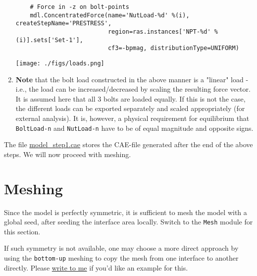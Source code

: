 \documentclass[11pt]{article}
\begin{document}
\begin{enumerate}
\begin{verbatim}
    # Force in -z on bolt-points
    mdl.ConcentratedForce(name='NutLoad-%d' %(i), createStepName='PRESTRESS',
                          region=ras.instances['NPT-%d' %(i)].sets['Set-1'],
                          cf3=-bpmag, distributionType=UNIFORM)
\end{verbatim}
\begin{center}
\texttt{[image: ./figs/loads.png]}
\end{center}
\item \textbf{Note} that the bolt load constructed in the above manner is a "linear" load - i.e., the load can be increased/decreased by scaling the resulting force vector.
It is assumed here that all 3 bolts are loaded equally.
If this is not the case, the different loads can be exported separately and scaled appropriately (for external analysis).
It is, however, a physical requirement for equilibrium that \texttt{BoltLoad-n} and \texttt{NutLoad-n} have to be of equal magnitude and opposite signs.
\end{enumerate}

The file \href{https://github.com/Nidish96/Abaqus4Joints/blob/main/assets/assembly/model\_step1.cae}{model\_step1.cae} stores the CAE-file generated after the end of the above steps.
We will now proceed with meshing.
\pagebreak
\section{Meshing}
\label{sec:meshing}
Since the model is perfectly symmetric, it is sufficient to mesh the model with a global seed, after seeding the interface area locally.
Switch to the \texttt{Mesh} module for this section.

If such symmetry is not available, one may choose a more direct approach by using the \texttt{bottom-up} meshing to copy the mesh from one interface to another directly.
Please \href{mailto:nidish.balaji@ila.uni-stuttgart.de}{write to me} if you'd like an example for this.
\end{document}
